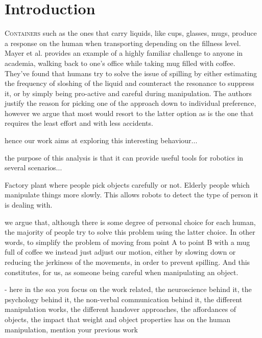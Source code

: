 \section{Introduction}

\lettrine{C}{ontainers} such as the ones that carry liquids, like cups, glasses, mugs, produce a response on the human when transporting depending on the fillness level. Mayer et al. \cite{mayer_walking_2012} provides an example of a highly familiar challenge to anyone in academia, walking back to one's office while taking mug filled with coffee. They've found that humans try to solve the issue of spilling by either estimating the frequency of sloshing of the liquid and counteract the resonance to suppress it, or by simply being pro-active and careful during manipulation. The authors justify the reason for picking one of the approach down to individual preference, however we argue that most would resort to the latter option as is the one that requires the least effort and with less accidents. 

hence our work aims at exploring this interesting behaviour...


the purpose of this analysis is that it can provide useful tools for robotics in several scenarios...

Factory plant where people pick objects carefully or not. Elderly people which manipulate things more slowly. This allows robots to detect the type of person it is dealing with. 

we argue that, although there is some degree of personal choice for each human, the majority of people try to solve this problem using the latter choice. In other words, to simplify the problem of moving from point A to point B with a mug full of coffee we instead just adjust our motion, either by slowing down or reducing the jerkiness of the movements, in order to prevent spilling. And this constitutes, for us, as someone being careful when manipulating an object. 


- here in the soa you focus on the work related, the neuroscience behind it, the psychology behind it, the non-verbal communication behind it, the different manipulation works, the different handover approaches, the affordances of objects, the impact that weight and object properties has on the human manipulation, mention your previous work

